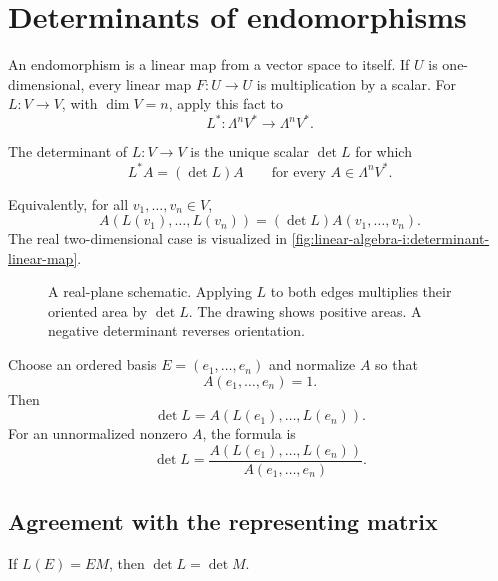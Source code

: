 \section{Determinants of endomorphisms}
\label{sec:linear-algebra-i:determinants-of-endomorphisms}

An endomorphism is a linear map from a vector space to itself. If \(U\)
is one-dimensional, every linear map \(F:U\to U\) is multiplication
by a scalar. For \(L:V\to V\), with \(\dim V=n\), apply this fact to
\[
  L^*:\Lambda^n V^*\longrightarrow\Lambda^n V^*.
\]

\begin{definition}
  The determinant of \(L:V\to V\) is the unique scalar \(\det L\)
  for which
  \begin{equation}
    L^*A=(\det L)A\qquad\text{for every \(A\in\Lambda^n V^*\)}.
    \label{eq:linear-algebra-i:determinant-pullback}
  \end{equation}
\end{definition}

Equivalently, for all \(v_1,\ldots,v_n\in V\),
\[
  A(L(v_1),\ldots,L(v_n))=(\det L)A(v_1,\ldots,v_n).
\]
The real two-dimensional case is visualized in
\autoref{fig:linear-algebra-i:determinant-linear-map}.
\begin{figure}[htbp]
  \centering
  
  \caption[Determinant as oriented-area scaling]{A real-plane schematic.
    Applying \(L\) to both edges multiplies their oriented area by
    \(\det L\). The drawing shows positive areas. A negative determinant
    reverses orientation.}
  \label{fig:linear-algebra-i:determinant-linear-map}
\end{figure}

Choose an ordered basis \(E=(e_1,\ldots,e_n)\) and normalize \(A\) so that
\[
  A(e_1,\ldots,e_n)=1.
\]
Then
\[
  \det L=A(L(e_1),\ldots,L(e_n)).
\]
For an unnormalized nonzero \(A\), the formula is
\[
  \det L=\frac{A(L(e_1),\ldots,L(e_n))}{A(e_1,\ldots,e_n)}.
\]

\subsection{Agreement with the representing matrix}

\begin{proposition}
  \label{thm:linear-algebra-i:determinant-representing-matrix}
  If \(L(E)=EM\), then \(\det L=\det M\).
\end{proposition}

